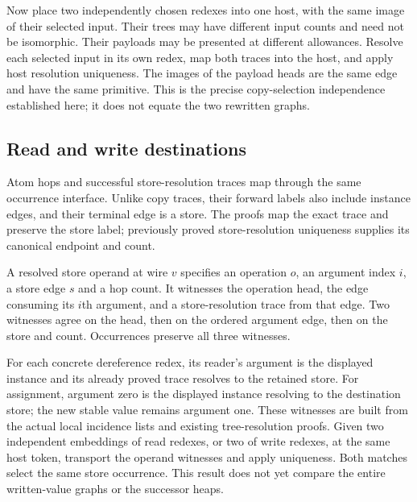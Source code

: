 
Now place two independently chosen redexes into one host, with the same image
of their selected input. Their trees may have different input counts and need
not be isomorphic. Their payloads may be presented at different allowances.
Resolve each selected input in its own redex, map both traces into the host,
and apply host resolution uniqueness. The images of the payload heads are
the same edge and have the same primitive. This is the precise copy-selection
independence established here; it does not equate the two rewritten graphs.


\subsection{Read and write destinations}

Atom hops and successful store-resolution traces map through the same
occurrence interface. Unlike copy traces, their forward labels also include
instance edges, and their terminal edge is a store. The proofs map the exact
trace and preserve the store label; previously proved store-resolution
uniqueness supplies its canonical endpoint and count.



A resolved store operand at wire $v$ specifies an operation $o$, an argument
index $i$, a store edge $s$ and a hop count. It witnesses the operation head,
the edge consuming its $i$th argument, and a store-resolution trace from that
edge. Two witnesses agree on the head, then on the ordered argument edge,
then on the store and count. Occurrences preserve all three witnesses.




For each concrete dereference redex, its reader's argument is the displayed
instance and its already proved trace resolves to the retained store. For
assignment, argument zero is the displayed instance resolving to the
destination store; the new stable value remains argument one. These witnesses
are built from the actual local incidence lists and existing tree-resolution
proofs. Given two independent embeddings of read redexes, or two of write
redexes, at the same host token, transport the operand witnesses and apply
uniqueness. Both matches select the same store occurrence. This result does
not yet compare the entire written-value graphs or the successor heaps.

